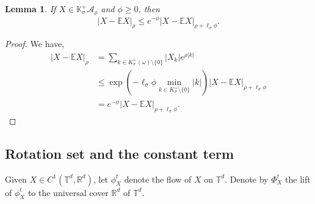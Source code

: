 \documentclass[12pt,reqno,a4paper]{amsart}%
\numberwithin{equation}{section}
\newtheorem{lemma}[theorem]{Lemma}
\newcommand{\As}{{\mathscr{A}}}
\newcommand{\A}{{\mathcal A}}
\newcommand{\TT}{{\mathcal T}}
\newcommand{\Ee}{{\mathbb{E}}}
\newcommand{\Kk}{{\mathbb{K}}}
\newcommand{\Rr}{{\mathbb{R}}}
\newcommand{\Tt}{{\mathbb{T}}}
\newcommand{\Zz}{{\mathbb{Z}}}
\def\SL{\operatorname{SL}}
\begin{document}
\begin{lemma}\label{lem:norm improvement}
If $X\in \Kk^+_\sigma\A_{\rho}$ and $\phi\geq0$, then
$$
|X-\Ee X|_{\rho}\leq e^{-\phi}|X-\Ee X|_{\rho+\ell_{\sigma}\phi}.
$$
\end{lemma}
\begin{proof}
We have,
\begin{align*}
|X-\Ee X|_{\rho}&=\sum_{k\in  K^+_\sigma(\omega)\setminus\{0\}} |X_k|e^{\rho|k|}\\
&\leq \exp\left(-\ell_{\sigma}\phi\min_{k\in K^+_\sigma\setminus\{0\}}|k|\right)|X-\Ee X|_{\rho+\ell_{\sigma}\phi}\\
&=e^{-\phi}|X-\Ee X|_{\rho+\ell_{\sigma}\phi}.
\end{align*}
\end{proof}



%
%

\subsection{Rotation set and the constant term}\label{sec:rotation vector}
Given $X\in C^1(\Tt^d,\Rr^d)$, let $\phi_X^t$ denote the flow of $X$ on $\Tt^d$. Denote by $\Phi_X^t$ the lift of $\phi_X^t$ to the universal cover $\Rr^d$ of $\Tt^d$. 
\end{document}
